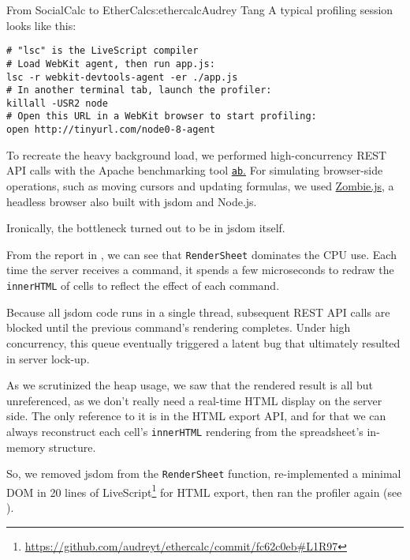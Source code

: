 \begin{aosachapter}{From SocialCalc to EtherCalc}{s:ethercalc}{Audrey Tang}
A typical profiling session looks like this:

\begin{verbatim}
# "lsc" is the LiveScript compiler
# Load WebKit agent, then run app.js:
lsc -r webkit-devtools-agent -er ./app.js
# In another terminal tab, launch the profiler:
killall -USR2 node
# Open this URL in a WebKit browser to start profiling:
open http://tinyurl.com/node0-8-agent
\end{verbatim}

To recreate the heavy background load, we performed high-concurrency
REST API calls with the Apache benchmarking tool
\href{http://httpd.apache.org/docs/trunk/programs/ab.html}{\texttt{ab}.}
For simulating browser-side operations, such as moving cursors and
updating formulas, we used
\href{http://zombie.labnotes.org/}{Zombie.js}, a headless browser also
built with jsdom and Node.js.

Ironically, the bottleneck turned out to be in jsdom itself.


From the report in , we can see that
\texttt{RenderSheet} dominates the CPU use. Each time the server
receives a command, it spends a few microseconds to redraw the
\texttt{innerHTML} of cells to reflect the effect of each command.

Because all jsdom code runs in a single thread, subsequent REST API
calls are blocked until the previous command's rendering completes.
Under high concurrency, this queue eventually triggered a latent bug
that ultimately resulted in server lock-up.

As we scrutinized the heap usage, we saw that the rendered result is all
but unreferenced, as we don't really need a real-time HTML display on
the server side. The only reference to it is in the HTML export API, and
for that we can always reconstruct each cell's \texttt{innerHTML}
rendering from the spreadsheet's in-memory structure.

So, we removed jsdom from the \texttt{RenderSheet} function,
re-implemented a minimal DOM in 20 lines of
LiveScript\footnote{\url{https://github.com/audreyt/ethercalc/commit/fc62c0eb#L1R97}}
for HTML export, then ran the profiler again (see
).



\end{aosachapter}
